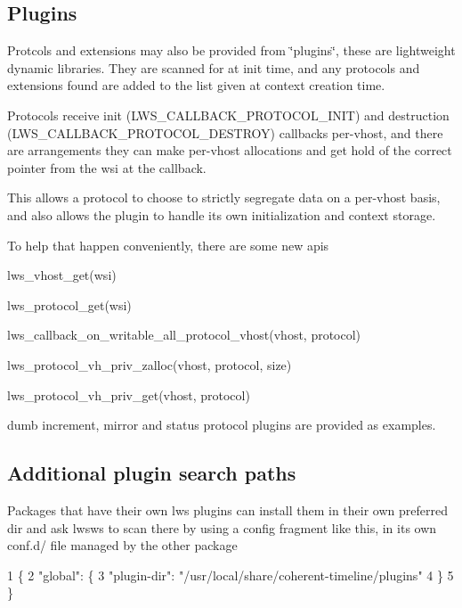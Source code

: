 \subsection*{Plugins }

Protcols and extensions may also be provided from \char`\"{}plugins\char`\"{}, these are lightweight dynamic libraries. They are scanned for at init time, and any protocols and extensions found are added to the list given at context creation time.

Protocols receive init (L\+W\+S\+\_\+\+C\+A\+L\+L\+B\+A\+C\+K\+\_\+\+P\+R\+O\+T\+O\+C\+O\+L\+\_\+\+I\+N\+IT) and destruction (L\+W\+S\+\_\+\+C\+A\+L\+L\+B\+A\+C\+K\+\_\+\+P\+R\+O\+T\+O\+C\+O\+L\+\_\+\+D\+E\+S\+T\+R\+OY) callbacks per-\/vhost, and there are arrangements they can make per-\/vhost allocations and get hold of the correct pointer from the wsi at the callback.

This allows a protocol to choose to strictly segregate data on a per-\/vhost basis, and also allows the plugin to handle its own initialization and context storage.

To help that happen conveniently, there are some new apis


\begin{DoxyItemize}
\item lws\+\_\+vhost\+\_\+get(wsi)
\item lws\+\_\+protocol\+\_\+get(wsi)
\item lws\+\_\+callback\+\_\+on\+\_\+writable\+\_\+all\+\_\+protocol\+\_\+vhost(vhost, protocol)
\item lws\+\_\+protocol\+\_\+vh\+\_\+priv\+\_\+zalloc(vhost, protocol, size)
\item lws\+\_\+protocol\+\_\+vh\+\_\+priv\+\_\+get(vhost, protocol)
\end{DoxyItemize}

dumb increment, mirror and status protocol plugins are provided as examples.

\subsection*{Additional plugin search paths }

Packages that have their own lws plugins can install them in their own preferred dir and ask lwsws to scan there by using a config fragment like this, in its own conf.\+d/ file managed by the other package 
\begin{DoxyCode}
1 \{
2   "global": \{
3    "plugin-dir": "/usr/local/share/coherent-timeline/plugins"
4   \}
5 \}
\end{DoxyCode}



